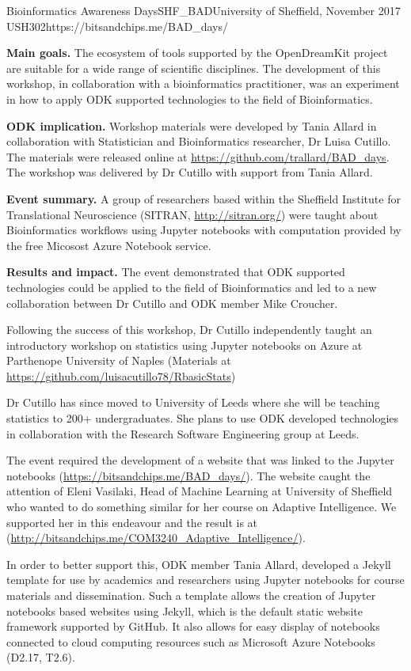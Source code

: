 \begin{event}{Bioinformatics Awareness Days}{SHF_BAD}{University of Sheffield, November 2017 }{USH}{30}{2}{https://bitsandchips.me/BAD_days/}

\textbf{Main goals.} The ecosystem of tools supported by the OpenDreamKit project are suitable for a wide range of scientific disciplines. The development of this workshop, in collaboration with a bioinformatics practitioner, was an experiment in how to apply ODK supported technologies to the field of Bioinformatics.

\textbf{ODK implication.} Workshop materials were developed by Tania Allard in collaboration with Statistician and Bioinformatics researcher, Dr Luisa Cutillo.  The materials were released online at \url{https://github.com/trallard/BAD_days}. The workshop was delivered by Dr Cutillo with support from Tania Allard.

\textbf{Event summary.} A group of researchers based within the Sheffield Institute for Translational Neuroscience (SITRAN, \url{http://sitran.org/}) were taught about Bioinformatics workflows using Jupyter notebooks with computation provided by the free Micosost Azure Notebook service.

\textbf{Results and impact.} The event demonstrated that ODK supported technologies could be applied to the field of Bioinformatics and led to a new collaboration between Dr Cutillo and ODK member Mike Croucher.

Following the success of this workshop, Dr Cutillo independently taught an introductory workshop on statistics using Jupyter notebooks on Azure at Parthenope University of Naples (Materials at \url{https://github.com/luisacutillo78/RbasicStats})

Dr Cutillo has since moved to University of Leeds where she will be teaching statistics to 200+ undergraduates. She plans to use ODK developed technologies in collaboration with the Research Software Engineering group at Leeds.

The event required the development of a website that was linked to the Jupyter notebooks (\url{https://bitsandchips.me/BAD_days/}). The website caught the attention of Eleni Vasilaki, Head of Machine Learning at University of Sheffield who wanted to do something similar for her course on Adaptive Intelligence. We supported her in this endeavour and the result is at (\url{http://bitsandchips.me/COM3240_Adaptive_Intelligence/}).

In order to better support this, ODK member Tania Allard, developed a Jekyll template for use by academics and researchers using Jupyter notebooks for course materials and dissemination. Such a template allows the creation of Jupyter notebooks based websites using Jekyll, which is the default static website framework supported by GitHub. It also allows for easy display of notebooks connected to cloud computing resources such as Microsoft Azure Notebooks (D2.17, T2.6).


\end{event}
